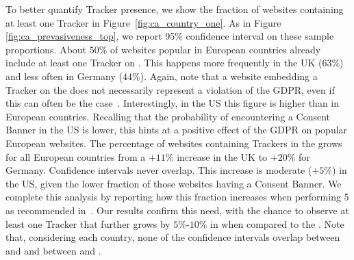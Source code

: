 To better quantify Tracker presence, we show the fraction of websites containing at least one Tracker in Figure~\ref{fig:ca_country_one}. As in Figure \ref{fig:ca_prevasiveness_top}, we report 95\% confidence interval on these sample proportions. About $50\%$ of websites popular in European countries already include at least one Tracker on \BEFORE. This happens more frequently in the UK ($63\%$) and less often in Germany ($44\%$). Again, note that a website embedding a Tracker on the \BEFORE does not necessarily represent a violation of the GDPR, even if this can often be the case~\cite{trevisan20194}. Interestingly, in the US this figure is higher than in European countries. Recalling that the probability of encountering a Consent Banner in the US is lower, this hints at a positive effect of the GDPR on popular European websites. The percentage of websites containing Trackers in the \AFTER grows for all European countries from a $+11\%$ increase in the UK to $+20\%$ for Germany. Confidence intervals never overlap. This increase is moderate ($+5\%$) in the US, given the lower fraction of those websites having a Consent Banner. We complete this analysis by reporting how this fraction increases when performing 5 \INTERNAL as recommended in~\cite{aqeel2020on}. Our results confirm this need, with the chance to observe at least one Tracker that further grows by $5\%$-$10\%$ in \INTERNAL when compared to the \AFTER. Note that, considering each country, none of the confidence intervals overlap between \BEFORE and \AFTER and between \AFTER and \INTERNAL.

